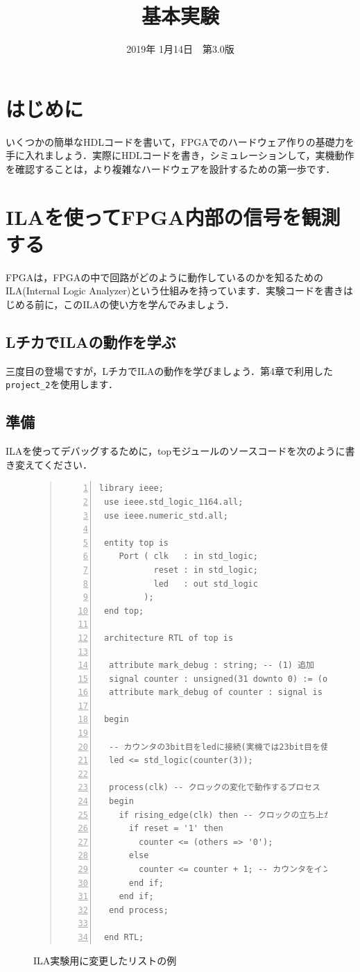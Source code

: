 \documentclass[a4paper,dvipdfmx]{jsarticle}
\begin{document}
\title{基本実験}
\author{}
\date{2019年 1月14日~~第3.0版}
\maketitle

\section{はじめに}
いくつかの簡単なHDLコードを書いて，FPGAでのハードウェア作りの基礎力を手に入れましょう．実際にHDLコードを書き，シミュレーションして，実機動作を確認することは，より複雑なハードウェアを設計するための第一歩です．

\section{ILAを使ってFPGA内部の信号を観測する}
FPGAは，FPGAの中で回路がどのように動作しているのかを知るためのILA(Internal Logic Analyzer)という仕組みを持っています．実験コードを書きはじめる前に，このILAの使い方を学んでみましょう．

\subsection{LチカでILAの動作を学ぶ}
三度目の登場ですが，LチカでILAの動作を学びましょう．第4章で利用した\verb|project_2|を使用します．

\subsection{準備}
ILAを使ってデバッグするために，topモジュールのソースコードを次のように書き変えてください．

\begin{figure}[H]
\begin{quote}
\begin{Verbatim}[frame=single, numbers=left, baselinestretch=0.8]
 library ieee;
 use ieee.std_logic_1164.all;
 use ieee.numeric_std.all;

 entity top is
    Port ( clk   : in std_logic;
           reset : in std_logic;
           led   : out std_logic
         );
 end top;

 architecture RTL of top is
  
  attribute mark_debug : string; -- (1) 追加
  signal counter : unsigned(31 downto 0) := (others => '0');
  attribute mark_debug of counter : signal is "true"; -- (2) 追加

 begin

  -- カウンタの3bit目をledに接続(実機では23bit目を使った)
  led <= std_logic(counter(3));

  process(clk) -- クロックの変化で動作するプロセス
  begin
    if rising_edge(clk) then -- クロックの立ち上がりであれば
      if reset = '1' then
        counter <= (others => '0');
      else
        counter <= counter + 1; -- カウンタをインクリメント
      end if;
    end if;
  end process;

 end RTL;
\end{Verbatim}
\end{quote}
\caption{ILA実験用に変更したリストの例}
\end{figure}
\end{document}
